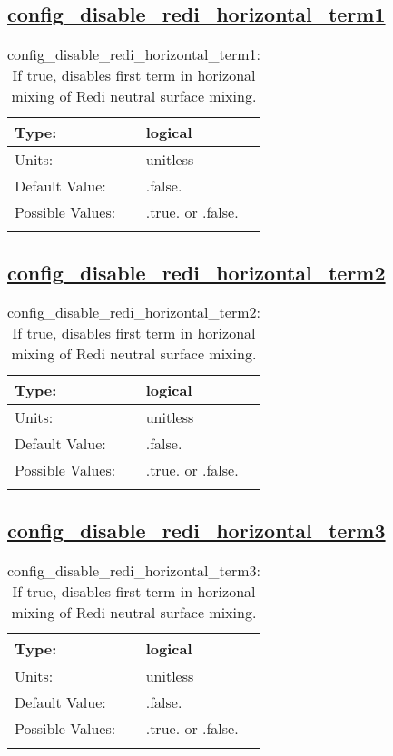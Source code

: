 \subsection[config\_disable\_redi\_horizontal\_term1]{\hyperref[sec:nm_tab_debug]{config\_disable\_redi\_horizontal\_term1}}
\label{subsec:nm_sec_config_disable_redi_horizontal_term1}
\begin{center}
\begin{longtable}{| p{2.0in} || p{4.0in} |}
    \hline
    Type: & logical \\
    \hline
    Units: & \si{unitless} \\
    \hline
    Default Value: & .false. \\
    \hline
    Possible Values: & .true. or .false. \\
    \hline
    \caption{config\_disable\_redi\_horizontal\_term1: If true, disables first term in horizonal mixing of Redi neutral surface mixing.}
\end{longtable}
\end{center}
\subsection[config\_disable\_redi\_horizontal\_term2]{\hyperref[sec:nm_tab_debug]{config\_disable\_redi\_horizontal\_term2}}
\label{subsec:nm_sec_config_disable_redi_horizontal_term2}
\begin{center}
\begin{longtable}{| p{2.0in} || p{4.0in} |}
    \hline
    Type: & logical \\
    \hline
    Units: & \si{unitless} \\
    \hline
    Default Value: & .false. \\
    \hline
    Possible Values: & .true. or .false. \\
    \hline
    \caption{config\_disable\_redi\_horizontal\_term2: If true, disables first term in horizonal mixing of Redi neutral surface mixing.}
\end{longtable}
\end{center}
\subsection[config\_disable\_redi\_horizontal\_term3]{\hyperref[sec:nm_tab_debug]{config\_disable\_redi\_horizontal\_term3}}
\label{subsec:nm_sec_config_disable_redi_horizontal_term3}
\begin{center}
\begin{longtable}{| p{2.0in} || p{4.0in} |}
    \hline
    Type: & logical \\
    \hline
    Units: & \si{unitless} \\
    \hline
    Default Value: & .false. \\
    \hline
    Possible Values: & .true. or .false. \\
    \hline
    \caption{config\_disable\_redi\_horizontal\_term3: If true, disables first term in horizonal mixing of Redi neutral surface mixing.}
\end{longtable}
\end{center}
